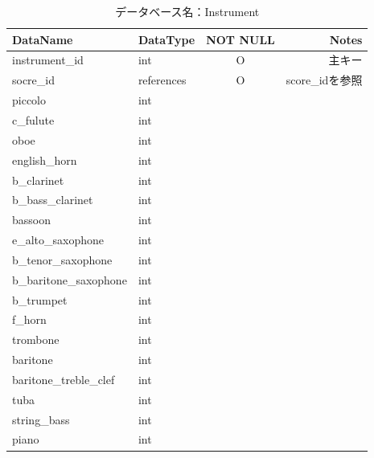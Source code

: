 \begin{table}[p]
    \caption{データベース名：Instrument}
    \begin{tabularx}{\textwidth}{llcR}
        \hline
        DataName               & DataType    & NOT NULL & Notes        \\
        \hline
        instrument\_id         & int         & O        & 主キー          \\
        socre\_id              & references  & O        & score\_idを参照 \\
        piccolo                & int         &          &              \\
        c\_fulute              & int         &          &              \\
        oboe                   & int         &          &              \\
        english\_horn          & int         &          &              \\
        b\_clarinet            & int         &          &              \\
        b\_bass\_clarinet      & int         &          &              \\
        bassoon                & int         &          &              \\
        e\_alto\_saxophone     & int         &          &              \\
        b\_tenor\_saxophone    & int         &          &              \\
        b\_baritone\_saxophone & int         &          &              \\
        b\_trumpet             & int         &          &              \\
        f\_horn                & int         &          &              \\
        trombone               & int         &          &              \\
        baritone               & int         &          &              \\
        baritone\_treble\_clef & int         &          &              \\
        tuba                   & int         &          &              \\
        string\_bass           & int         &          &              \\
        piano                  & int         &          &              \\

\end{tabularx}
\end{table}
